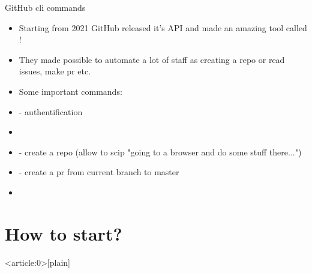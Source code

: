 \documentclass[usenames,dvipsnames,10pt,aspectratio=169]{beamer}
\begin{document}
\begin{frame}{GitHub cli commands}
    \begin{itemize}
        \item Starting from 2021 GitHub released it's API and made an amazing tool called !
        \item They made possible to automate a lot of staff as creating a repo or read issues, make pr etc.
        \item Some important commands:
        \item {} - authentification
        \item {}
        \item {} - create a repo (allow to scip "going to a browser and do some stuff there...")
        \item {} - create a pr from current branch to master
        \item {}
    \end{itemize}
\end{frame}

\section{How to start?}
{ %
    \begin{frame}<article:0>[plain]
     \end{frame}
}
\end{document}
